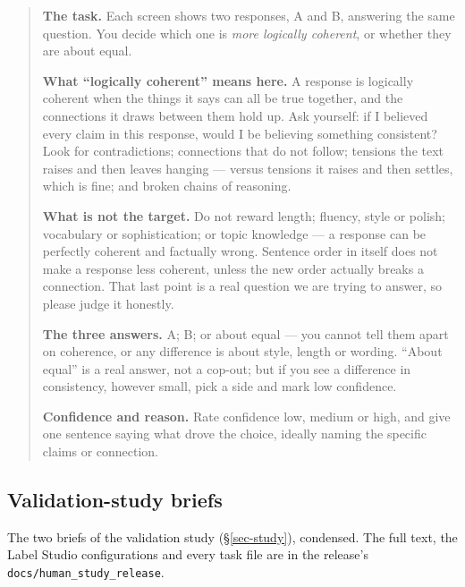 \begin{quote}\small
\textbf{The task.} Each screen shows two responses, A and B, answering the same question. You decide which one is
\emph{more logically coherent}, or whether they are about equal.

\textbf{What ``logically coherent'' means here.} A response is logically coherent when the things it says can all be
true together, and the connections it draws between them hold up. Ask yourself: if I believed every claim in this
response, would I be believing something consistent? Look for contradictions; connections that do not follow; tensions
the text raises and then leaves hanging --- versus tensions it raises and then settles, which is fine; and broken chains
of reasoning.

\textbf{What is not the target.} Do not reward length; fluency, style or polish; vocabulary or sophistication; or topic
knowledge --- a response can be perfectly coherent and factually wrong. Sentence order in itself does not make a response
less coherent, unless the new order actually breaks a connection. That last point is a real question we are trying to
answer, so please judge it honestly.

\textbf{The three answers.} A; B; or about equal --- you cannot tell them apart on coherence, or any difference is about
style, length or wording. ``About equal'' is a real answer, not a cop-out; but if you see a difference in consistency,
however small, pick a side and mark low confidence.

\textbf{Confidence and reason.} Rate confidence low, medium or high, and give one sentence saying what drove the choice,
ideally naming the specific claims or connection.
\end{quote}

\subsection{Validation-study briefs}
\label{app-study-briefs}
The two briefs of the validation study (\S\ref{sec-study}), condensed. The full text, the Label Studio
configurations and every task file are in the release's \texttt{docs/human\_study\_release}.

